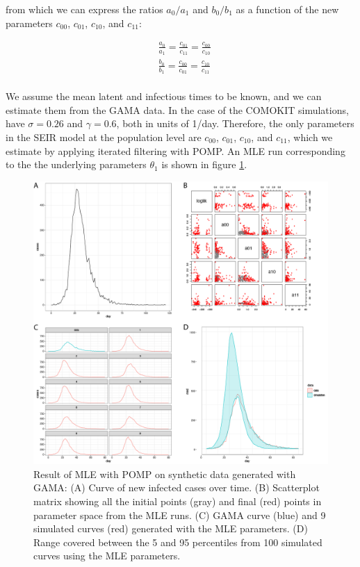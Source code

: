 \documentclass{article}
\begin{document}
from which we can express the ratios $a_0/a_1$ and $b_0/b_1$ as a function of the new parameters $c_{00}$, $c_{01}$, $c_{10}$, and $c_{11}$:

\begin{equation}
\begin{aligned}
& \frac{a_0}{a_1} = \frac{c_{01}}{c_{11}} = \frac{c_{00}}{c_{10}} \\
& \frac{b_0}{b_1} = \frac{c_{00}}{c_{01}} = \frac{c_{10}}{c_{11}} \\
\end{aligned}
\label{eq:eq2}
\end{equation}

We assume the mean latent and infectious times to be known, and we can estimate them from the GAMA data. In the case of the COMOKIT simulations, have $\sigma=0.26$ and $\gamma=0.6$, both in units of 1/day. Therefore, the only parameters in the SEIR model at the population level are $c_{00}$, $c_{01}$, $c_{10}$, and $c_{11}$, which we estimate by applying iterated filtering with POMP. An MLE run corresponding to the the underlying parameters $\theta_1$ is shown in figure \ref{fig:fig1}.

\begin{figure} %
  \centering
  \includegraphics[scale=0.4]{Figure-1.png}
  \caption{Result of MLE with POMP on synthetic data generated with GAMA: (A) Curve of new infected cases over time. (B) Scatterplot matrix showing all the initial points (gray) and final (red) points in parameter space from the MLE runs. (C) GAMA curve (blue) and 9 simulated curves (red) generated with the MLE parameters. (D) Range covered between the 5 and 95 percentiles from 100 simulated curves using the MLE parameters. }
  \label{fig:fig1}
\end{figure}
\end{document}
